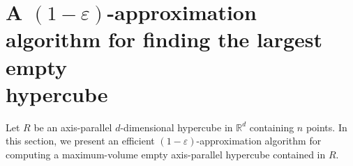 \documentclass[11pt]{article}
\newcommand{\later}[1]{{}}
\newcommand{\eps}{\varepsilon}
\newcommand{\RR}{\mathbb{R}}
\begin{document}
\section{A $(1-\eps)$-approximation algorithm for finding the largest
empty \\ hypercube}\label{sec:approx2}  

Let $R$ be an axis-parallel $d$-dimensional hypercube in $\RR^d$ 
containing $n$ points. In this section, we present an efficient
$(1-\eps)$-approximation algorithm for computing a maximum-volume
empty axis-parallel hypercube contained in $R$. 
\later{
Recall that 
with exact algorithms, a largest empty hypercube can be found faster
than a largest empty box~\cite{BK09a,BK09b}, as mentioned in the
introduction. In our case, with approximation algorithms, 
the situation is analogous, and we are able to obtain a faster
algorithm for finding the largest hypercube:
} 
\end{document}

